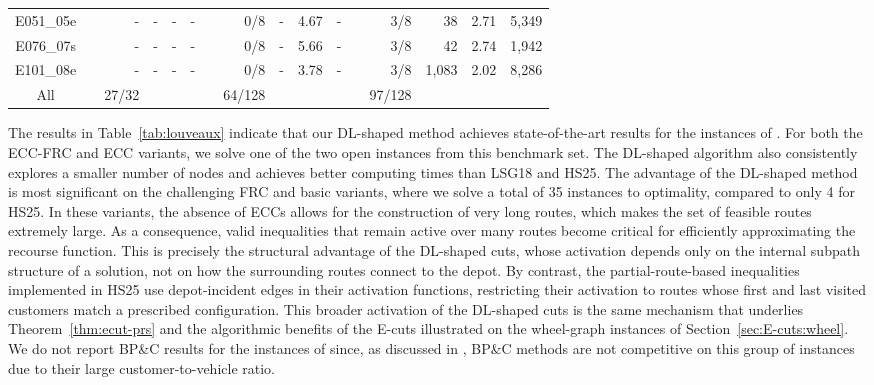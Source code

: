 \documentclass{article}
\newcommand{\rev}[1]{{\color{black}#1}}
\begin{document}
\begin{table}[htbp]
\begin{tabular*}{\textwidth}{@{\extracolsep{\fill}}ccrrrrrrrrrrrrrr}
    E051\_05e &  & - & - & - & - &  & 0/8 & - & 4.67 & - &  & 3/8 & 38 & 2.71 & 5,349 \\
    E076\_07s &  & - & - & - & - &  & 0/8 & - & 5.66 & - &  & 3/8 & 42 & 2.74 & 1,942 \\
    E101\_08e &  & - & - & - & - &  & 0/8 & - & 3.78 & - &  & 3/8 & 1,083 & 2.02 & 8,286 \\ \hline
    All &  & \hspace{-1cm}27/32 \hspace{-0.22cm} &  &  &  &  & \hspace{-1cm}64/128\hspace{-0.22cm} &  &  &  &  & \hspace{-1cm}97/128\hspace{-0.22cm} &  &  &  \\ \hline
    \end{tabular*}
\end{table}

The results in Table~\ref{tab:louveaux} indicate that our DL-shaped method achieves state-of-the-art results for the instances of \cite{louveaux2018exact}. For both the ECC-FRC and ECC variants, we solve one of the two open instances from this benchmark set. The DL-shaped algorithm also consistently explores a smaller number of nodes and achieves better computing times than LSG18 and HS25. The advantage of the DL-shaped method is most significant on the challenging FRC and basic variants, where we solve a total of 35 instances to optimality, compared to only 4 for HS25. In these variants, the absence of ECCs allows for the construction of very long routes, which makes the set of feasible routes extremely large. As a consequence, valid inequalities that remain active over many routes become critical for efficiently approximating the recourse function. \rev{This is precisely the structural advantage of the DL-shaped cuts, whose activation depends only on the internal subpath structure of a solution, not on how the surrounding routes connect to the depot. By contrast, the partial-route-based inequalities implemented in HS25 use depot-incident edges in their activation functions, restricting their activation to routes whose first and last visited customers match a prescribed configuration. This broader activation of the DL-shaped cuts is the same mechanism that underlies Theorem~\ref{thm:ecut-prs} and the algorithmic benefits of the E-cuts illustrated on the wheel-graph instances of Section~\ref{sec:E-cuts:wheel}.} We do not report BP\&C results for the instances of \cite{louveaux2018exact} since, as discussed in \cite{florio2023recent}, BP\&C methods are not competitive on this group of instances due to their large customer-to-vehicle ratio.
\end{document}
